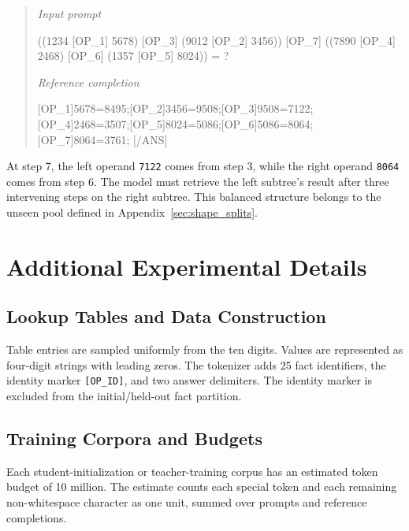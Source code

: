 \documentclass[]{template}
\theoremstyle{plain}
\theoremstyle{definition}
\theoremstyle{remark}
\begin{document}
\begin{quote}
\small
\textit{Input prompt}\par\smallskip
{\ttfamily\noindent
((1234 [OP\_1] 5678) [OP\_3] (9012 [OP\_2] 3456)) [OP\_7]\newline
\hspace*{1em}((7890 [OP\_4] 2468) [OP\_6] (1357 [OP\_5] 8024)) = ?\par}
\medskip
\textit{Reference completion}\par\smallskip
{\ttfamily{}[OP\_1]5678=8495;[OP\_2]3456=9508;[OP\_3]9508=7122;[OP\_4]2468=3507;[OP\_5]8024=5086;[OP\_6]5086=8064;[OP\_7]8064=3761; [/ANS]\par}
\end{quote}

At step 7, the left operand \texttt{7122} comes from step 3, while the right operand \texttt{8064} comes from step 6. The model must retrieve the left subtree's result after three intervening steps on the right subtree. This balanced structure belongs to the unseen pool defined in Appendix~\ref{sec:shape_splits}.

\section{Additional Experimental Details}
\label{sec:v31_details}

\subsection{Lookup Tables and Data Construction}
Table entries are sampled uniformly from the ten digits. Values are represented as four-digit strings with leading zeros. The tokenizer adds 25 fact identifiers, the identity marker \texttt{[OP\_ID]}, and two answer delimiters. The identity marker is excluded from the initial/held-out fact partition.

\subsection{Training Corpora and Budgets}
\label{sec:training_corpora}
Each student-initialization or teacher-training corpus has an estimated token budget of 10 million. The estimate counts each special token and each remaining non-whitespace character as one unit, summed over prompts and reference completions.
\end{document}
